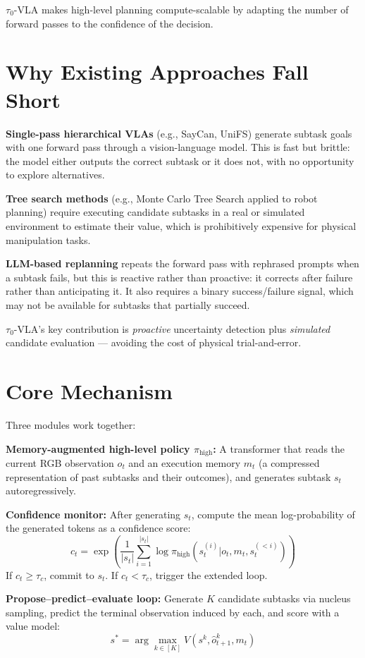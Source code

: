 \documentclass[10pt,twocolumn]{article}
\begin{document}
$\tau_0$-VLA makes high-level planning compute-scalable by adapting
the number of forward passes to the confidence of the decision.

\section{Why Existing Approaches Fall Short}

\textbf{Single-pass hierarchical VLAs} (e.g., SayCan, UniFS) generate
subtask goals with one forward pass through a vision-language model.
This is fast but brittle: the model either outputs the correct subtask
or it does not, with no opportunity to explore alternatives.

\textbf{Tree search methods} (e.g., Monte Carlo Tree Search applied to
robot planning) require executing candidate subtasks in a real or
simulated environment to estimate their value, which is prohibitively
expensive for physical manipulation tasks.

\textbf{LLM-based replanning} repeats the forward pass with
rephrased prompts when a subtask fails, but this is reactive rather
than proactive: it corrects after failure rather than anticipating it.
It also requires a binary success/failure signal, which may not be
available for subtasks that partially succeed.

$\tau_0$-VLA's key contribution is \emph{proactive} uncertainty
detection plus \emph{simulated} candidate evaluation — avoiding the
cost of physical trial-and-error.

\section{Core Mechanism}

Three modules work together:

\textbf{Memory-augmented high-level policy $\pi_\text{high}$:} A
transformer that reads the current RGB observation $o_t$ and an
execution memory $m_t$ (a compressed representation of past subtasks
and their outcomes), and generates subtask $s_t$ autoregressively.

\textbf{Confidence monitor:} After generating $s_t$, compute the
mean log-probability of the generated tokens as a confidence score:
\[
  c_t = \exp\!\left(\frac{1}{|s_t|}\sum_{i=1}^{|s_t|}
    \log\pi_\text{high}(s_t^{(i)} | o_t, m_t, s_t^{(<i)})\right)
\]
If $c_t \geq \tau_c$, commit to $s_t$. If $c_t < \tau_c$, trigger
the extended loop.

\textbf{Propose--predict--evaluate loop:} Generate $K$ candidate
subtasks via nucleus sampling, predict the terminal observation
induced by each, and score with a value model:
\[
  s^* = \arg\max_{k \in [K]} V\!\left(s^k, \hat{o}_{t+1}^k, m_t\right)
\]
\end{document}
